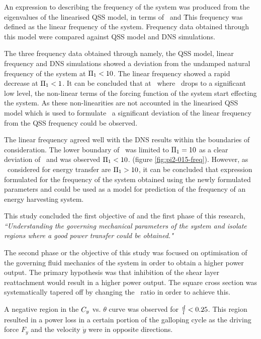  An expression to describing the frequency of the system was produced from the eigenvalues of the linearised QSS model, in terms of \massstiff\ and \massdamp\. This frequency was defined as the linear frequency \freqlin of the system. Frequency data obtained through this model were compared against QSS model and DNS simulations.
 
 
 The three frequency data obtained through namely, the QSS model, linear frequency and DNS simulations showed a deviation from the undamped natural frequency of the system at $\Pi_1<10$. The linear frequency showed a rapid decrease at $\Pi_1<1$. It can be concluded that at \massstiff\, where \massstiff\ drops to a significant low level, the non-linear terms of the forcing function of the system start effecting the system. As these non-linearities are not accounted in the linearised QSS model which is used to formulate \freqlin\ a significant deviation of the linear frequency from the QSS frequency could be observed.
 
 The linear frequency agreed well with the DNS results within the boundaries of consideration. The lower boundary of \massstiff\ was limited to $\Pi_1=10$ as a clear deviation of \freqlin\ and \freqdns was observed $\Pi_1<10$. (figure \ref{fig:pi2-015-freq}). However, as \massstiff\ considered for energy transfer are $\Pi_1>10$, it can be concluded that expression formulated for the frequency of the system obtained using the newly formulated parameters \massstiff and \massdamp could be used as a model for prediction of the frequency of an energy harvesting system.  
 
 
 This study concluded the first objective of and the first phase of this research, \emph{``Understanding the governing mechanical parameters of the system and isolate regions where a good power transfer could be obtained."}
 
 The second phase or the objective of this study was focused on optimisation of the governing fluid mechanics of the system in order to obtain a higher power output. The primary hypothesis was that inhibition of the shear layer  reattachment would result in a higher power output. The square cross section was systematically tapered off by changing the \ratio\ ratio in order to achieve this.
 
 
  A negative region in the $C_{y}$ vs. $\theta$ curve was observed for $\frac{d}{l}<0.25$. This region resulted in a power loss in a certain portion of the galloping cycle as the driving force $F_y$ and the velocity $\dot{y}$ were in opposite directions.
 
